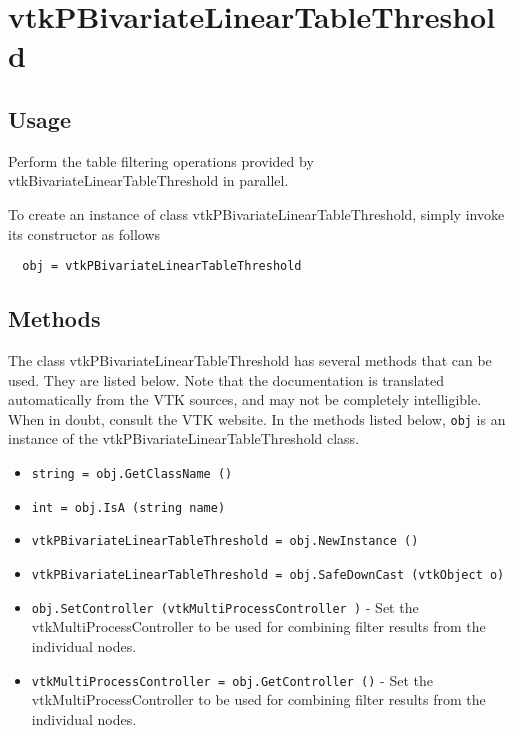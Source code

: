 \section{vtkPBivariateLinearTableThreshold}

\subsection{Usage}

 Perform the table filtering operations provided by 
 vtkBivariateLinearTableThreshold in parallel.

To create an instance of class vtkPBivariateLinearTableThreshold, simply
invoke its constructor as follows
\begin{verbatim}
  obj = vtkPBivariateLinearTableThreshold
\end{verbatim}
\subsection{Methods}

The class vtkPBivariateLinearTableThreshold has several methods that can be used.
  They are listed below.
Note that the documentation is translated automatically from the VTK sources,
and may not be completely intelligible.  When in doubt, consult the VTK website.
In the methods listed below, \verb|obj| is an instance of the vtkPBivariateLinearTableThreshold class.
\begin{itemize}
\item  \verb|string = obj.GetClassName ()|

\item  \verb|int = obj.IsA (string name)|

\item  \verb|vtkPBivariateLinearTableThreshold = obj.NewInstance ()|

\item  \verb|vtkPBivariateLinearTableThreshold = obj.SafeDownCast (vtkObject o)|

\item  \verb|obj.SetController (vtkMultiProcessController )| -  Set the vtkMultiProcessController to be used for combining filter
 results from the individual nodes.

\item  \verb|vtkMultiProcessController = obj.GetController ()| -  Set the vtkMultiProcessController to be used for combining filter
 results from the individual nodes.

\end{itemize}
